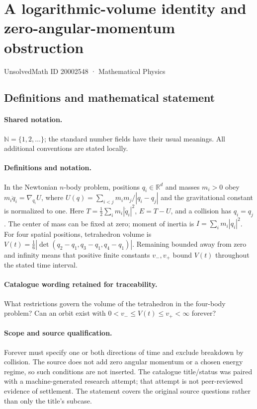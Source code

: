 \documentclass[11pt]{article}
\begin{document}
\setcounter{section}{20002547}
\section{A logarithmic-volume identity and zero-angular-momentum obstruction}\label{20002548}
{\small UnsolvedMath ID 20002548 · Mathematical Physics}
\subsection{Definitions and mathematical statement}

\paragraph{Shared notation.}$\mathbb N=\{1,2,\ldots\}$; the standard number fields have their usual meanings. All additional conventions are stated locally.


\paragraph{Definitions and notation.}In the Newtonian $n$-body problem, positions $q_i\in\mathbb R^d$ and masses $m_i>0$ obey $m_i\ddot q_i=\nabla_{q_i}U$, where $U(q)=\sum_{i<j}m_im_j/|q_i-q_j|$ and the gravitational constant is normalized to one. Here $T=\tfrac12\sum_i m_i|\dot q_i|^2$, $E=T-U$, and a collision has $q_i=q_j$. The center of mass can be fixed at zero; moment of inertia is $I=\sum_i m_i|q_i|^2$. For four spatial positions, tetrahedron volume is $V(t)=\tfrac16|\det(q_2-q_1,q_3-q_1,q_4-q_1)|$. Remaining bounded away from zero and infinity means that positive finite constants $v_-,v_+$ bound $V(t)$ throughout the stated time interval.

\paragraph{Catalogue wording retained for traceability.}
What restrictions govern the volume of the tetrahedron in the four-body problem? Can an orbit exist with $0<v_-\le V(t)\le v_+<\infty$ forever?
\paragraph{Scope and source qualification.}Forever must specify one or both directions of time and exclude breakdown by collision. The source does not add zero angular momentum or a chosen energy regime, so such conditions are not inserted. The catalogue title/status was paired with a machine-generated research attempt; that attempt is not peer-reviewed evidence of settlement. The statement covers the original source questions rather than only the title’s subcase.
\end{document}
